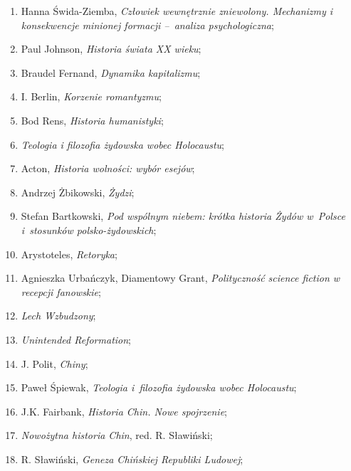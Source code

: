 \documentclass[a4paper,11pt]{article}
\begin{document}
\begin{enumerate}
\item Hanna Świda-Ziemba, \textit{Człowiek wewnętrznie zniewolony.
    Mechanizmy i konsekwencje minionej formacji --~analiza
    psychologiczna};

\item Paul Johnson, \textit{Historia świata XX wieku};

\item Braudel Fernand, \textit{Dynamika kapitalizmu};

\item I. Berlin, \textit{Korzenie romantyzmu};

\item Bod Rens, \textit{Historia humanistyki};

\item \textit{Teologia i filozofia żydowska wobec Holocaustu};

\item Acton, \textit{Historia wolności: wybór esejów};

\item Andrzej Żbikowski, \textit{Żydzi};

\item Stefan Bartkowski, \textit{Pod wspólnym niebem: krótka historia
    Żydów w~Polsce i~stosunków polsko-żydowskich};

\item Arystoteles, \textit{Retoryka};

\item Agnieszka Urbańczyk, Diamentowy Grant, \textit{Polityczność
    science fiction w recepcji fanowskie};

\item \textit{Lech Wzbudzony};

\item \textit{Unintended Reformation};

\item J. Polit, \textit{Chiny};

\item Paweł Śpiewak, \textit{Teologia i~filozofia żydowska wobec
    Holocaustu};

\item J.K. Fairbank, \textit{Historia Chin. Nowe spojrzenie};

\item \textit{Nowożytna historia Chin}, red. R. Sławiński;

\item R. Sławiński, \textit{Geneza Chińskiej Republiki Ludowej};


\end{enumerate}
\end{document}
